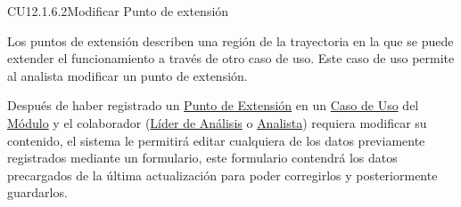 	\begin{UseCase}{CU12.1.6.2}{Modificar Punto de extensión}{
		Los puntos de extensión describen una región de la trayectoria en la que se puede extender el funcionamiento a través de otro caso de uso. Este caso de uso permite al analista modificar un punto de extensión.
		
		Después de haber registrado un \hyperlink{entidadExtension}{Punto de Extensión} en un \hyperlink{casoUso}{Caso de Uso} del \hyperlink{moduloEntidad}{Módulo} y el colaborador (\hyperlink{jefe}{Líder de Análisis} o \hyperlink{analista}{Analista}) requiera modificar su contenido, el sistema le permitirá editar cualquiera de los datos previamente registrados mediante un formulario, este formulario contendrá los datos precargados de la última actualización para poder corregirlos y posteriormente guardarlos.\\
		
}
\end{UseCase}
